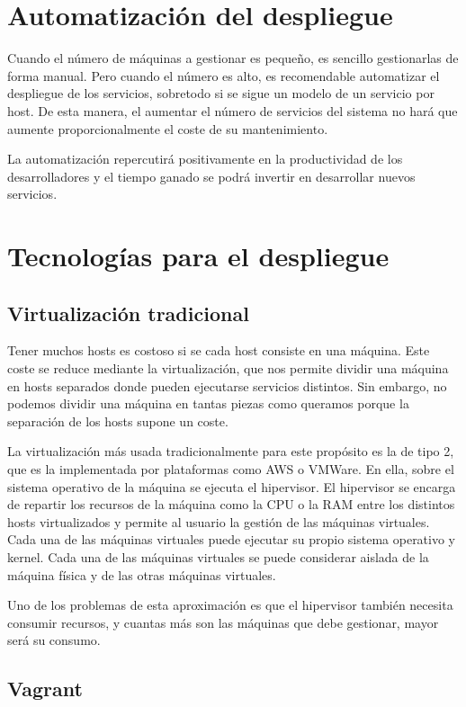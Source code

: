 \documentclass[11pt,a4paper]{article}
\begin{document}
\section{Automatización del despliegue}

Cuando el número de máquinas a gestionar es pequeño, es sencillo gestionarlas de forma manual. Pero cuando el número es alto, es recomendable automatizar el despliegue de los servicios, sobretodo si se sigue un modelo de un servicio por host. De esta manera, el aumentar el número de servicios del sistema no hará que aumente proporcionalmente el coste de su mantenimiento.

La automatización repercutirá positivamente en la productividad de los desarrolladores y el tiempo ganado se podrá invertir en desarrollar nuevos servicios. 

\section{Tecnologías para el despliegue}

\subsection{Virtualización tradicional}

Tener muchos hosts es costoso si se cada host consiste en una máquina. Este coste se reduce mediante la virtualización, que nos permite dividir una máquina en hosts separados donde pueden ejecutarse servicios distintos. Sin embargo, no podemos dividir una máquina en tantas piezas como queramos porque la separación de los hosts supone un coste.

La virtualización más usada tradicionalmente para este propósito es la de tipo 2, que es la implementada por plataformas como AWS o VMWare. En ella, sobre el sistema operativo de la máquina se ejecuta el hipervisor. El hipervisor se encarga de repartir los recursos de la máquina como la CPU o la RAM entre los distintos hosts virtualizados y permite al usuario la gestión de las máquinas virtuales. Cada una de las máquinas virtuales puede ejecutar su propio sistema operativo y kernel. Cada una de las  máquinas virtuales se puede considerar aislada de la máquina física y de las otras máquinas virtuales.

Uno de los problemas de esta aproximación es que el hipervisor también necesita consumir recursos, y cuantas más son las máquinas que debe gestionar, mayor será su consumo.

\subsection{Vagrant}
\end{document}
